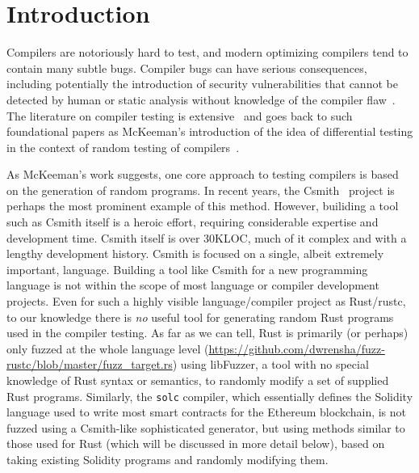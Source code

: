 \section{Introduction}

Compilers are notoriously hard to test, and modern optimizing
compilers tend to contain many subtle bugs.  Compiler bugs can have
serious consequences, including potentially the introduction of
security vulnerabilities that cannot be detected by human or static
analysis without knowledge of the compiler flaw~\cite{CompBug}.   The
literature on compiler testing is extensive~\cite{chen2020survey} and
goes back to such foundational papers as McKeeman's introduction of
the idea of differential testing in the context of random testing of
compilers~\cite{Differential}.

As McKeeman's work suggests, one core approach to testing compilers is
based on
the generation of random programs.  In recent
years, the Csmith~\cite{csmith} project is perhaps the most prominent
example of this method.  However, builiding a tool such as Csmith
itself is a heroic effort, requiring considerable expertise and
development time.  Csmith itself is over 30KLOC, much of it complex
and with a lengthy development history.  Csmith is focused on a
single, albeit extremely important, language.  Building a tool like
Csmith for a new programming language is not within the scope of most
language or compiler development projects.  Even for such a highly
visible language/compiler project as Rust/rustc, to our knowledge
there is \emph{no} useful tool for generating random Rust programs
used in the compiler testing.  As far as we can tell, Rust
is primarily (or perhaps) only fuzzed at the whole language level (\url{https://github.com/dwrensha/fuzz-rustc/blob/master/fuzz_target.rs}) using libFuzzer, a tool with no special knowledge of Rust
syntax or semantics, to randomly modify a set of supplied Rust
programs.  Similarly, the {\tt solc} compiler, which essentially
defines the Solidity language used to write most smart contracts for
the Ethereum blockchain, is not fuzzed using a Csmith-like
sophisticated generator, but using methods similar to those used for
Rust (which will be discussed in more detail below), based on taking
existing Solidity programs and randomly modifying them.


